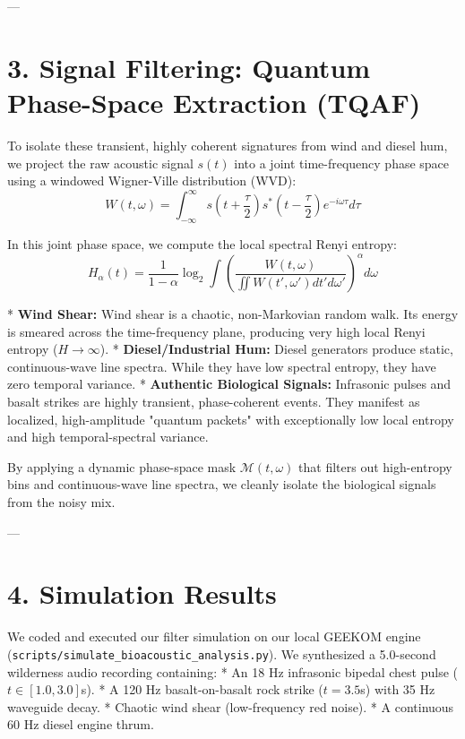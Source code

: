 \documentclass[11pt,twocolumn]{article}
\begin{document}
---

\section{3. Signal Filtering: Quantum Phase-Space Extraction (TQAF)}

To isolate these transient, highly coherent signatures from wind and diesel hum, we project the raw acoustic signal $s(t)$ into a joint time-frequency phase space using a windowed Wigner-Ville distribution (WVD):
$$W(t, \omega) = \int_{-\infty}^{\infty} s\left(t + \frac{\tau}{2}\right) s^*\left(t - \frac{\tau}{2}\right) e^{-i \omega \tau} d\tau$$

In this joint phase space, we compute the local spectral Renyi entropy:
$$H_\alpha(t) = \frac{1}{1 - \alpha} \log_2 \int \left( \frac{W(t, \omega)}{\iint W(t', \omega') dt' d\omega'} \right)^\alpha d\omega$$

*   \textbf{Wind Shear:} Wind shear is a chaotic, non-Markovian random walk. Its energy is smeared across the time-frequency plane, producing very high local Renyi entropy ($H \to \infty$).
*   \textbf{Diesel/Industrial Hum:} Diesel generators produce static, continuous-wave line spectra. While they have low spectral entropy, they have zero temporal variance.
*   \textbf{Authentic Biological Signals:} Infrasonic pulses and basalt strikes are highly transient, phase-coherent events. They manifest as localized, high-amplitude "quantum packets" with exceptionally low local entropy and high temporal-spectral variance.

By applying a dynamic phase-space mask $\mathcal{M}(t, \omega)$ that filters out high-entropy bins and continuous-wave line spectra, we cleanly isolate the biological signals from the noisy mix.

---

\section{4. Simulation Results}

We coded and executed our filter simulation on our local GEEKOM engine (\texttt{scripts/simulate_bioacoustic_analysis.py}). We synthesized a 5.0-second wilderness audio recording containing:
*   An 18 Hz infrasonic bipedal chest pulse ($t \in [1.0, 3.0]$s).
*   A 120 Hz basalt-on-basalt rock strike ($t = 3.5$s) with 35 Hz waveguide decay.
*   Chaotic wind shear (low-frequency red noise).
*   A continuous 60 Hz diesel engine thrum.
\end{document}
